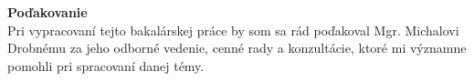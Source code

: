 \makeatletter
\thispagestyle{empty}
\vspace*{\fill}
\begin{flushleft}
    \textbf{Poďakovanie}\\[1em]
    \hspace*{1.5em}Pri vypracovaní tejto bakalárskej práce by som sa rád poďakoval Mgr. Michalovi Drobnému za jeho odborné vedenie, cenné rady a konzultácie, ktoré mi významne pomohli pri spracovaní danej témy.
\end{flushleft}
\begin{flushright}
    \@author
\end{flushright}
\clearpage
\makeatother
